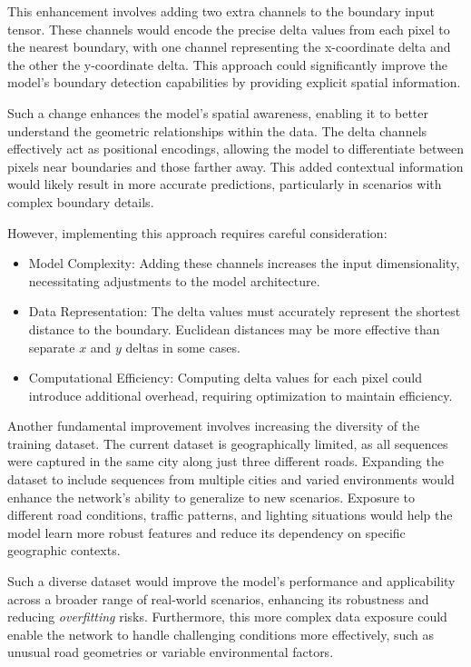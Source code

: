 This enhancement involves adding two extra channels to the boundary input tensor. These channels would encode the precise delta values from each pixel to the nearest boundary, with one channel representing the x-coordinate delta and the other the y-coordinate delta. This approach could significantly improve the model’s boundary detection capabilities by providing explicit spatial information.

Such a change enhances the model's spatial awareness, enabling it to better understand the geometric relationships within the data. The delta channels effectively act as positional encodings, allowing the model to differentiate between pixels near boundaries and those farther away. This added contextual information would likely result in more accurate predictions, particularly in scenarios with complex boundary details.

However, implementing this approach requires careful consideration:
\begin{itemize}
    \item Model Complexity: Adding these channels increases the input dimensionality, necessitating adjustments to the model architecture.
    \item Data Representation: The delta values must accurately represent the shortest distance to the boundary. Euclidean distances may be more effective than separate $x$ and $y$ deltas in some cases.
    \item Computational Efficiency: Computing delta values for each pixel could introduce additional overhead, requiring optimization to maintain efficiency.
\end{itemize} 

Another fundamental improvement involves increasing the diversity of the training dataset. The current dataset is geographically limited, as all sequences were captured in the same city along just three different roads. Expanding the dataset to include sequences from multiple cities and varied environments would enhance the network's ability to generalize to new scenarios. Exposure to different road conditions, traffic patterns, and lighting situations would help the model learn more robust features and reduce its dependency on specific geographic contexts.

Such a diverse dataset would improve the model's performance and applicability across a broader range of real-world scenarios, enhancing its robustness and reducing \textit{overfitting} risks. Furthermore, this more complex data exposure could enable the network to handle challenging conditions more effectively, such as unusual road geometries or variable environmental factors.

